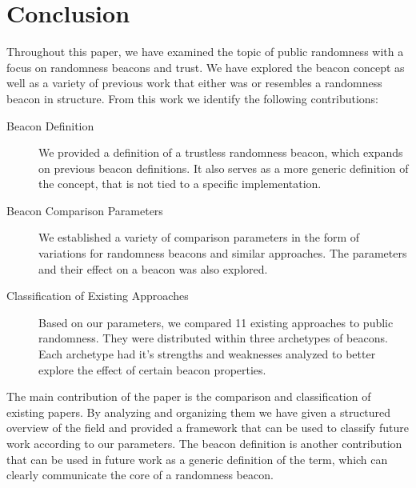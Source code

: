 \section{Conclusion}\label{sec:conclusion}
Throughout this paper, we have examined the topic of public randomness with a focus on randomness beacons and trust. We have explored the beacon concept as well as a variety of previous work that either was or resembles a randomness beacon in structure. 
From this work we identify the following contributions:

\begin{description}
    \item [Beacon Definition] We provided a definition of a trustless randomness beacon, which expands on previous beacon definitions. It also serves as a more generic definition of the concept, that is not tied to a specific implementation. 
    \item [Beacon Comparison Parameters] We established a variety of comparison parameters in the form of variations for randomness beacons and similar approaches. The parameters and their effect on a beacon was also explored. 
    \item [Classification of Existing Approaches] Based on our parameters, we compared 11 existing approaches to public randomness. They were distributed within three archetypes of beacons. Each archetype had it's strengths and weaknesses analyzed to better explore the effect of certain beacon properties. 
\end{description}

The main contribution of the paper is the comparison and classification of existing papers. By analyzing and organizing them we have given a structured overview of the field and provided a framework that can be used to classify future work according to our parameters. 
The beacon definition is another contribution that can be used in future work as a generic definition of the term, which can clearly communicate the core of a randomness beacon. 